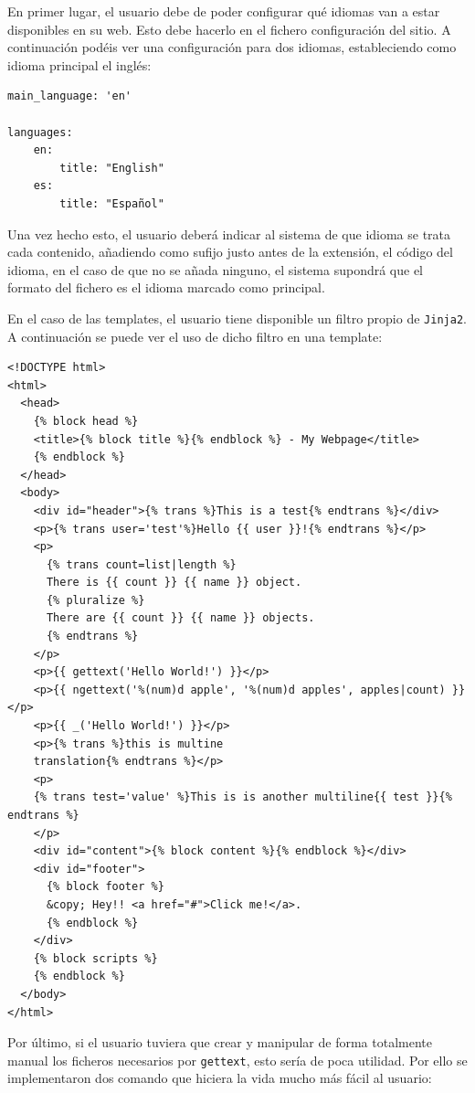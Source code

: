 En primer lugar, el usuario debe de poder configurar qué idiomas van a estar disponibles en su web. Esto debe hacerlo
en el fichero configuración del sitio. A continuación podéis ver una configuración para dos idiomas, estableciendo como
idioma principal el inglés:

\begin{verbatim}
main_language: 'en'

languages:
    en:
		title: "English"
    es:
		title: "Español"
\end{verbatim}

Una vez hecho esto, el usuario deberá indicar al sistema de que idioma se trata cada contenido, añadiendo como sufijo
justo antes de la extensión, el código del idioma, en el caso de que no se añada ninguno, el sistema supondrá que
el formato del fichero es el idioma marcado como principal.

En el caso de las templates, el usuario tiene disponible un filtro propio de \texttt{Jinja2}. A continuación
se puede ver el uso de dicho filtro en una template:

\begin{verbatim}
<!DOCTYPE html>
<html>
  <head>
    {% block head %}
    <title>{% block title %}{% endblock %} - My Webpage</title>
    {% endblock %}
  </head>
  <body>
    <div id="header">{% trans %}This is a test{% endtrans %}</div>
    <p>{% trans user='test'%}Hello {{ user }}!{% endtrans %}</p>
    <p>
      {% trans count=list|length %}
      There is {{ count }} {{ name }} object.
      {% pluralize %}
      There are {{ count }} {{ name }} objects.
      {% endtrans %}
    </p>
    <p>{{ gettext('Hello World!') }}</p>
    <p>{{ ngettext('%(num)d apple', '%(num)d apples', apples|count) }}</p>
    <p>{{ _('Hello World!') }}</p>
    <p>{% trans %}this is multine
    translation{% endtrans %}</p>
    <p>
    {% trans test='value' %}This is is another multiline{{ test }}{% endtrans %}
    </p>
    <div id="content">{% block content %}{% endblock %}</div>
    <div id="footer">
      {% block footer %}
      &copy; Hey!! <a href="#">Click me!</a>.
      {% endblock %}
    </div>
    {% block scripts %}
    {% endblock %}
  </body>
</html>
\end{verbatim}

Por último, si el usuario tuviera que crear y manipular de forma totalmente manual los ficheros
necesarios por \texttt{gettext}, esto sería de poca utilidad. Por ello se implementaron dos comando
que hiciera la vida mucho más fácil al usuario:

